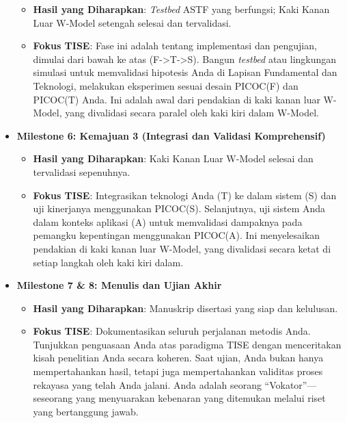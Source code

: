 \documentclass[
  letterpaper,
  DIV=11,
  numbers=noendperiod]{scrreprt}
\providecommand{\tightlist}{%
  \setlength{\itemsep}{0pt}\setlength{\parskip}{0pt}}
\begin{document}
\begin{itemize}
  \begin{itemize}
  \tightlist
  \item
    \textbf{Hasil yang Diharapkan}: \emph{Testbed} ASTF yang berfungsi;
    Kaki Kanan Luar W-Model setengah selesai dan tervalidasi.
  \item
    \textbf{Fokus TISE}: Fase ini adalah tentang implementasi dan
    pengujian, dimulai dari bawah ke atas
    (F-\textgreater T-\textgreater S). Bangun \emph{testbed} atau
    lingkungan simulasi untuk memvalidasi hipotesis Anda di Lapisan
    Fundamental dan Teknologi, melakukan eksperimen sesuai desain
    PICOC(F) dan PICOC(T) Anda. Ini adalah awal dari pendakian di kaki
    kanan luar W-Model, yang divalidasi secara paralel oleh kaki kiri
    dalam W-Model.
  \end{itemize}
\item
  \textbf{Milestone 6: Kemajuan 3 (Integrasi dan Validasi Komprehensif)}

  \begin{itemize}
  \tightlist
  \item
    \textbf{Hasil yang Diharapkan}: Kaki Kanan Luar W-Model selesai dan
    tervalidasi sepenuhnya.
  \item
    \textbf{Fokus TISE}: Integrasikan teknologi Anda (T) ke dalam sistem
    (S) dan uji kinerjanya menggunakan PICOC(S). Selanjutnya, uji sistem
    Anda dalam konteks aplikasi (A) untuk memvalidasi dampaknya pada
    pemangku kepentingan menggunakan PICOC(A). Ini menyelesaikan
    pendakian di kaki kanan luar W-Model, yang divalidasi secara ketat
    di setiap langkah oleh kaki kiri dalam.
  \end{itemize}
\item
  \textbf{Milestone 7 \& 8: Menulis dan Ujian Akhir}

  \begin{itemize}
  \tightlist
  \item
    \textbf{Hasil yang Diharapkan}: Manuskrip disertasi yang siap dan
    kelulusan.
  \item
    \textbf{Fokus TISE}: Dokumentasikan seluruh perjalanan metodis Anda.
    Tunjukkan penguasaan Anda atas paradigma TISE dengan menceritakan
    kisah penelitian Anda secara koheren. Saat ujian, Anda bukan hanya
    mempertahankan hasil, tetapi juga mempertahankan validitas proses
    rekayasa yang telah Anda jalani. Anda adalah seorang
    ``Vokator''---seseorang yang menyuarakan kebenaran yang ditemukan
    melalui riset yang bertanggung jawab.
  \end{itemize}
\end{itemize}
\end{document}
